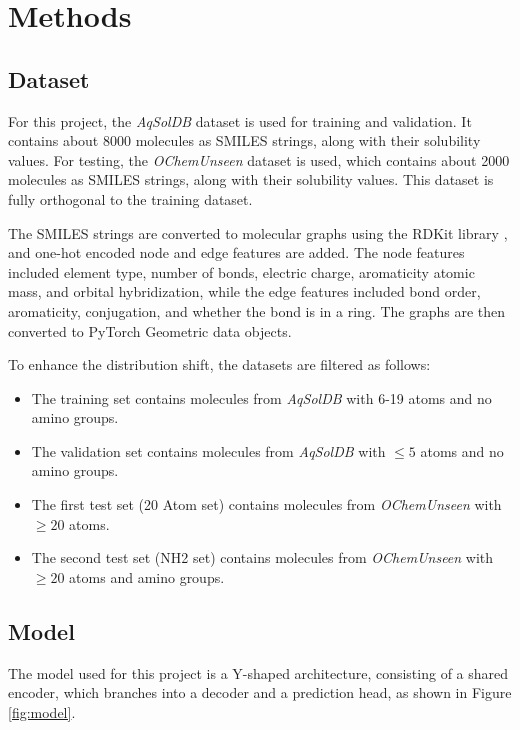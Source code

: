 \documentclass[11pt,a4paper]{article}
\begin{document}
\section{Methods}
\subsection{Dataset}

For this project, the \textit{AqSolDB} dataset \cite{sorkun2019aqsoldb} is used for training and validation. It contains about 8000 molecules as SMILES strings, along with their solubility values. For testing, the \textit{OChemUnseen} dataset \cite{llompart2024will} is used, which contains about 2000 molecules as SMILES strings, along with their solubility values. This dataset is fully orthogonal to the training dataset.

The SMILES strings are converted to molecular graphs using the RDKit library \cite{rdkit2025}, and one-hot encoded node and edge features are added. The node features included element type, number of bonds, electric charge, aromaticity atomic mass, and orbital hybridization, while the edge features included bond order, aromaticity, conjugation, and whether the bond is in a ring. The graphs are then converted to PyTorch Geometric \cite{fey2019fast} data objects.

To enhance the distribution shift, the datasets are filtered as follows:
\begin{itemize}
        \item The training set contains molecules from \textit{AqSolDB} with 6-19 atoms and no amino groups.
        \item The validation set contains molecules from \textit{AqSolDB} with $\leq 5$ atoms and no amino groups.
        \item The first test set (20 Atom set) contains molecules from \textit{OChemUnseen} with $\geq 20$ atoms.
        \item The second test set (NH2 set) contains molecules from \textit{OChemUnseen} with $\geq 20$ atoms and amino groups.
\end{itemize}

\subsection{Model}

The model used for this project is a Y-shaped architecture, consisting of a shared encoder, which branches into a decoder and a prediction head, as shown in Figure \ref{fig:model}.
\end{document}
